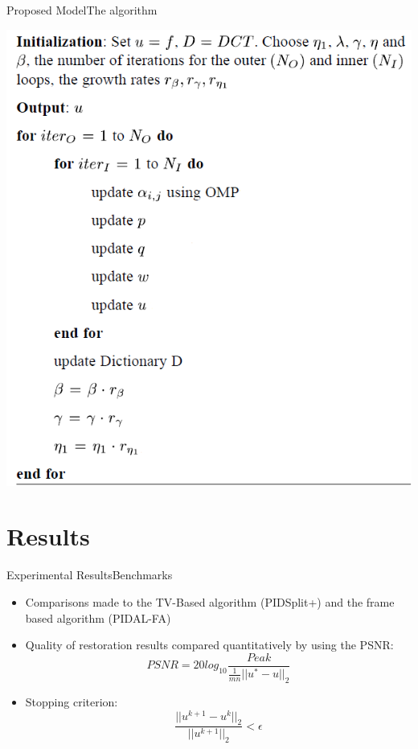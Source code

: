 \documentclass{beamer}
\begin{document}
\begin{frame}{Proposed Model}{The algorithm}

 \centering
    \includegraphics[scale=0.48]{algo.PNG}

\end{frame}

\section{Results}
\begin{frame}[t]{Experimental Results}{Benchmarks}
\begin{itemize}
    \item Comparisons made to the TV-Based algorithm (PIDSplit+) and the frame based algorithm (PIDAL-FA)
    \item Quality of restoration results compared quantitatively by using the PSNR: 
    \[
    PSNR = 20log_{10} \frac{Peak}{\frac{1}{mn} ||u^* - u ||_2}
    \]
    \item Stopping criterion:
    \[
    \frac{||u^{k+1} - u^k||_2}{||u^{k+1}||_2} < \epsilon
    \]
    
\end{itemize}
\end{frame}
\end{document}
